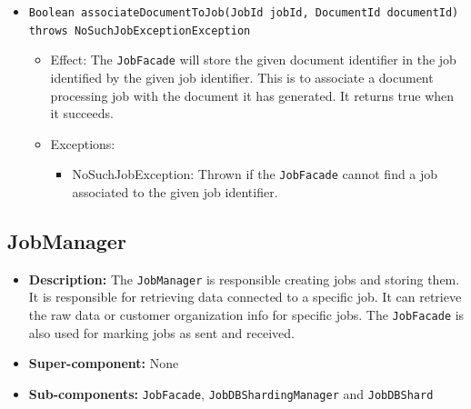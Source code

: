 \documentclass[a4paper,10pt]{article}
\begin{document}
\begin{itemize}
\begin{itemize}
    	\item \texttt{Boolean associateDocumentToJob(JobId jobId, DocumentId documentId) throws NoSuchJobExceptionException}
    	\begin{itemize}
    		\item Effect: The \texttt{JobFacade} will store the given document identifier in the job identified by the given job identifier. This is to associate a document processing job with the document it has generated. It returns true when it succeeds.
    		\item Exceptions:
    		\begin{itemize}
    			\item NoSuchJobException: Thrown if the \texttt{JobFacade} cannot find a job associated to the given job identifier.
    		\end{itemize}
    	\end{itemize} 	
 	
    	
    \end{itemize}
\end{itemize}

\subsection{JobManager}
\begin{itemize}
    \item \textbf{Description:} The \texttt{JobManager} is responsible creating jobs and storing them. It is responsible for retrieving data connected to a specific job. It can retrieve the raw data or customer organization info for specific jobs. The \texttt{JobFacade} is also used for marking jobs as sent and received.
    \item \textbf{Super-component:} None
    \item \textbf{Sub-components:} \texttt{JobFacade}, \texttt{JobDBShardingManager} and \texttt{JobDBShard}
\end{itemize}
\end{document}
